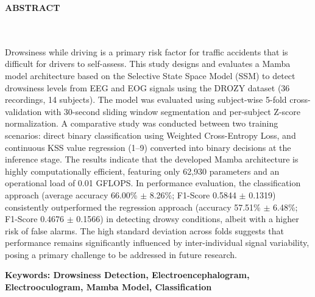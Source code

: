 \clearpage
{}%
\thispagestyle{fancy}

\begin{center}
	\large \bfseries \MakeUppercase{Abstract}\\
	\normalsize \normalfont {\thetitleEN}\\
	\normalsize \normalfont {\theauthor}\\
	\bigskip
	
	\normalsize \normalfont \justifying \singlespacing
	Drowsiness while driving is a primary risk factor for traffic accidents that is difficult for drivers to self-assess. This study designs and evaluates a Mamba model architecture based on the Selective State Space Model (SSM) to detect drowsiness levels from EEG and EOG signals using the DROZY dataset (36 recordings, 14 subjects). The model was evaluated using subject-wise 5-fold cross-validation with 30-second sliding window segmentation and per-subject Z-score normalization. A comparative study was conducted between two training scenarios: direct binary classification using Weighted Cross-Entropy Loss, and continuous KSS value regression (1--9) converted into binary decisions at the inference stage. The results indicate that the developed Mamba architecture is highly computationally efficient, featuring only 62,930 parameters and an operational load of 0.01 GFLOPS. In performance evaluation, the classification approach (average accuracy 66.00\% $\pm$ 8.26\%; F1-Score 0.5844 $\pm$ 0.1319) consistently outperformed the regression approach (accuracy 57.51\% $\pm$ 6.48\%; F1-Score 0.4676 $\pm$ 0.1566) in detecting drowsy conditions, albeit with a higher risk of false alarms. The high standard deviation across folds suggests that performance remains significantly influenced by inter-individual signal variability, posing a primary challenge to be addressed in future research. \par
    
    \vspace{20pt}
	\raggedright\textbf{Keywords: Drowsiness Detection, Electroencephalogram, Electrooculogram, Mamba Model, Classification}
	
	\vfill
	
\end{center}
\clearpage
